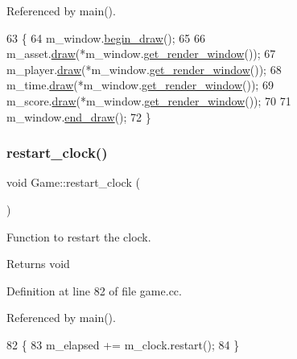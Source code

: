 Referenced by main().


\begin{DoxyCode}
63                   \{
64     m\_window.\hyperlink{class_window_a9a01adf499565557def564579805c413}{begin\_draw}();
65 
66     m\_asset.\hyperlink{class_assets_a22a160044158884eefe4bc93677c0211}{draw}(*m\_window.\hyperlink{class_window_ae921197766adfddd372dcc40879f8b45}{get\_render\_window}());
67     m\_player.\hyperlink{class_player_a70bbe0afb8ef88207288c9134ae80b6e}{draw}(*m\_window.\hyperlink{class_window_ae921197766adfddd372dcc40879f8b45}{get\_render\_window}());
68     m\_time.\hyperlink{class_text_a820f51d1ef58aa6ffadc10cc0e6ce479}{draw}(*m\_window.\hyperlink{class_window_ae921197766adfddd372dcc40879f8b45}{get\_render\_window}());
69     m\_score.\hyperlink{class_text_a820f51d1ef58aa6ffadc10cc0e6ce479}{draw}(*m\_window.\hyperlink{class_window_ae921197766adfddd372dcc40879f8b45}{get\_render\_window}());
70 
71     m\_window.\hyperlink{class_window_ae2d4995568b0bb68fd8dceff3cce216c}{end\_draw}();
72 \}
\end{DoxyCode}
\mbox{\label{class_game_a528bf1006e9dfed3b51d9aae79f8c287}} 
\subsubsection{\texorpdfstring{restart\+\_\+clock()}{restart\_clock()}}
{\footnotesize\ttfamily void Game\+::restart\+\_\+clock (\begin{DoxyParamCaption}{ }\end{DoxyParamCaption})}



Function to restart the clock. 

\begin{DoxyReturn}{Returns}
void 
\end{DoxyReturn}


Definition at line 82 of file game.\+cc.



Referenced by main().


\begin{DoxyCode}
82                          \{
83     m\_elapsed += m\_clock.restart();
84 \}
\end{DoxyCode}
\mbox{\label{class_game_a79df6376b332d63c9eca0dcee30305c3}} 
